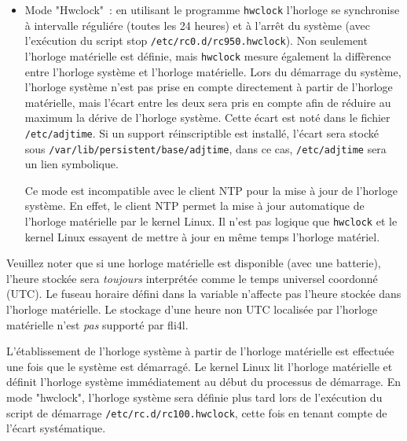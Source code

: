 \begin{description}
{\begin{itemize}
  Ce mode doit également être utilisé s'il n'existe aucune horloge matérielle. Bien sûr,
  le kernel Linux ne mettra pas à jour l'horloge matérielle car il n'y en a pas. Cependant,
  le client NTP doit être utilisé pour s'assurer que le routeur fli4l dispose d'une horloge
  système raisonnable.

  \item Mode "Hwclock"~: en utilisant le programme \texttt{hwclock} l'horloge se synchronise
  à intervalle réguliére (toutes les 24 heures) et à l'arrêt du système (avec l'exécution
  du script stop \texttt{/etc/rc0.d/rc950.hwclock}). Non seulement l'horloge matérielle est
  définie, mais \texttt{hwclock} mesure également la diffèrence entre l'horloge système et
  l'horloge matérielle. Lors du démarrage du système, l'horloge système n'est pas prise en compte
  directement à partir de l'horloge matérielle, mais l'écart entre les deux sera pris en compte
  afin de réduire au maximum la dérive de l'horloge système. Cette écart est noté dans le fichier
  \texttt{/etc/adjtime}. Si un support réinscriptible est installé, l'écart sera stocké sous
  \texttt{/var/lib/persistent/base/adjtime}, dans ce cas, \texttt{/etc/adjtime} sera un lien
  symbolique.

  Ce mode est incompatible avec le client NTP pour la mise à jour de l'horloge système.
  En effet, le client NTP permet la mise à jour automatique de l'horloge matérielle
  par le kernel Linux. Il n'est pas logique que \texttt{hwclock} et le kernel
  Linux essayent de mettre à jour en même temps l'horloge matériel.
  \end{itemize}

  Veuillez noter que si une horloge matérielle est disponible (avec une batterie), l'heure
  stockée sera \emph{toujours} interprétée comme le temps universel coordonné (UTC). Le
  fuseau horaire défini dans la variable  n'affecte pas l'heure stockée dans
  l'horloge matérielle. Le stockage d'une heure non UTC localisée par l'horloge matérielle
  n'est \emph{pas} supporté par fli4l.

  L'établissement de l'horloge système à partir de l'horloge matérielle est effectuée
  une fois que le système est démarragé. Le kernel Linux lit l'horloge matérielle et
  définit l'horloge système immédiatement au début du processus de démarrage. En mode
  "hwclock", l'horloge système sera définie plus tard lors de l'exécution du script
  de démarrage \texttt{/etc/rc.d/rc100.hwclock}, cette fois en tenant compte de l'écart
  systématique.
  }


\end{description}
